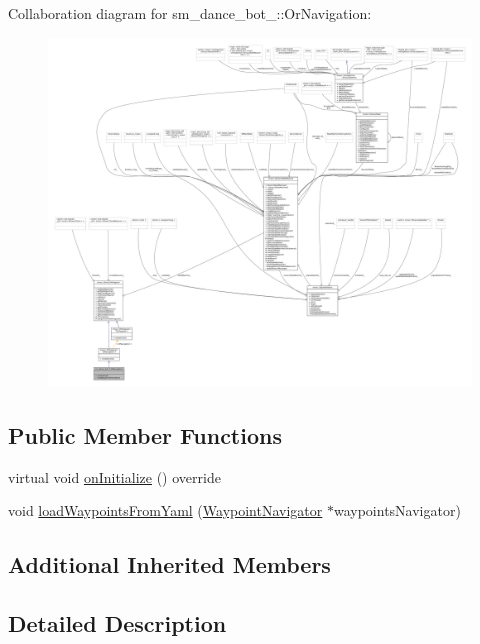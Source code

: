 Collaboration diagram for sm\+\_\+dance\+\_\+bot\+\_\+:\+:Or\+Navigation\+:
\nopagebreak
\begin{figure}[H]
\begin{center}
\leavevmode
\includegraphics[width=350pt]{classsm__dance__bot__2_1_1OrNavigation__coll__graph}
\end{center}
\end{figure}
\subsection*{Public Member Functions}
\begin{DoxyCompactItemize}
\item 
virtual void \hyperlink{classsm__dance__bot__2_1_1OrNavigation_acc491d801e0abacd9d152e048e77fab6}{on\+Initialize} () override
\item 
void \hyperlink{classsm__dance__bot__2_1_1OrNavigation_a663fc206de1964058c851f521279ca34}{load\+Waypoints\+From\+Yaml} (\hyperlink{classcl__move__base__z_1_1WaypointNavigator}{Waypoint\+Navigator} $\ast$waypoints\+Navigator)
\end{DoxyCompactItemize}
\subsection*{Additional Inherited Members}


\subsection{Detailed Description}


